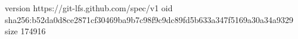 version https://git-lfs.github.com/spec/v1
oid sha256:b52da0d8ce2871cf30469ba9b7c98f9c9dc89fd5b633a347f5169a30a34a9329
size 174916
